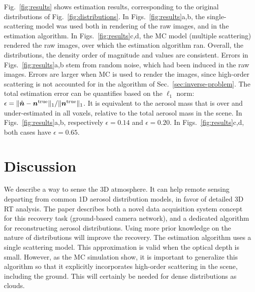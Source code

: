 \documentclass[10pt,letterpaper]{article}
\begin{document}
Fig.~\ref{fig:results} shows estimation results, corresponding to the
original distributions of Fig.~\ref{fig:distributions}. In
Figs.~\ref{fig:results}a,b, the single-scattering model was used both
in rendering of the raw images, and in the estimation algorithm. In
Figs.~\ref{fig:results}c,d, the MC model (multiple scattering)
rendered the raw images, over which the estimation algorithm
ran. Overall, the distributions, the density order of magnitude and
values are consistent.
Errors in Figs.~\ref{fig:results}a,b stem from random noise, which had
been induced in the raw images. Errors are larger when MC is used to
render the images, since high-order scattering is not accounted for in
the algorithm of Sec.~\ref{sec:inverse-problem}. The total estimation
error can be quantifies based on the $\ell_1$ norm: $\epsilon=\|
\hat{\bm n} - {\bm n}^{\rm true} \|_1 / \| {\bm n}^{\rm true} \|_1$.
It is equivalent to the aerosol mass that is over and under-estimated
in all voxels, relative to the total aerosol mass in the scene.  In
Figs.~\ref{fig:results}a,b, respectively $\epsilon=0.14$ and
$\epsilon=0.20$.  In Figs.~\ref{fig:results}c,d, both cases have
$\epsilon=0.65$.



\section{Discussion}
\label{sec:conclusions}

We describe a way to sense the 3D atmosphere. It can help 
remote sensing departing from common 1D aerosol distribution models, in favor of detailed 3D RT analysis.  The paper describes both a novel data
acquisition system concept for this recovery task (ground-based camera network), and a dedicated algorithm for reconstructing aerosol distributions. Using more prior knowledge on the nature of distributions will improve the recovery.  The estimation algorithm uses a single scattering model. This approximation is valid when the
optical depth is small. However, as the MC simulation show, it is important to generalize this algorithm so that it explicitly incorporates high-order scattering in the scene, including the ground. This will certainly be needed for dense distributions as clouds.
\end{document}
